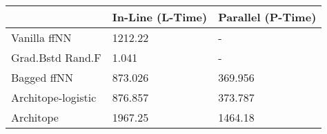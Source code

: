 \begin{tabular}{lll}
\toprule
{} & In-Line (L-Time) & Parallel (P-Time) \\
\midrule
Vanilla ffNN       &          1212.22 &                 - \\
Grad.Bstd Rand.F   &            1.041 &                 - \\
Bagged ffNN        &          873.026 &           369.956 \\
Architope-logistic &          876.857 &           373.787 \\
Architope          &          1967.25 &           1464.18 \\
\bottomrule
\end{tabular}
